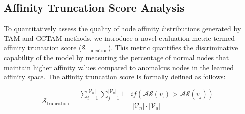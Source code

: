 \documentclass{article}
\begin{document}




\subsection{Affinity Truncation Score Analysis}
To quantitatively assess the quality of node affinity distributions generated by TAM and GCTAM methods, we introduce a novel evaluation metric termed affinity truncation score ($\mathcal{S}_\text{truncation}$). This metric quantifies the discriminative capability of the model by measuring the percentage of normal nodes that maintain higher affinity values compared to anomalous nodes in the learned affinity space. The affinity truncation score is formally defined as follows: 

\begin{equation}
    \mathcal{S}_{\text{truncation}}= \frac{\sum_{i=1}^{|{\mathcal V}_{n}|} \sum_{j=1}^{|{\mathcal V}_{a}|} {1} \quad if( \mathcal{AS}(v_i) > \mathcal{AS}(v_j))}   {|{\mathcal V}_{n}| \cdot |{\mathcal V}_{a}| }
    \label{eq: affinity truncation score}
\end{equation}
\end{document}
